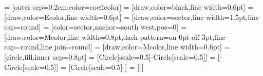 \newcommand\intersoffs{0.1} %
\newcommand\pathoffs{0.3} %
\newcommand\lineoffs{0.05} %
\newcommand\selfoffsouter{0.1} %
\newcommand\selfoffsinner{0.05} %
\newcommand\edgeext{0.4} %

 = [outer sep=0.2cm,color=coeffcolor]
 = [draw,color=black,line width=0.6pt]
 = [draw,color=Ecolor,line width=0.6pt]
 = [draw,color=sector,line width=1.5pt,line cap=round]
 = [color=sector,anchor=south west,pos=0]
 = [draw,color=Mcolor,line width=0.8pt,dash pattern=on 0pt off 3pt,line cap=round,line join=round]
 = [draw,color=Mcolor,line width=0.6pt]
 = [circle,fill,inner sep=0.8pt]
 = [{Circle[scale=0.5]}-{Circle[scale=0.5]}]
 = [-{Circle[scale=0.5]}]
 = [{Circle[scale=0.5]}-]
 = [-]

